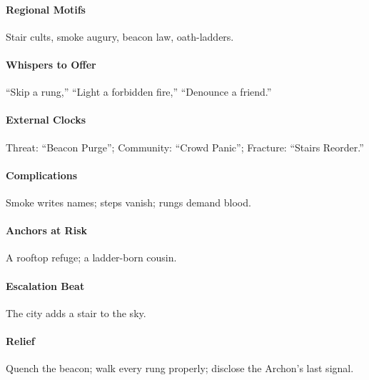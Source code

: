 \paragraph{Regional Motifs} Stair cults, smoke augury, beacon law, oath-ladders.
\paragraph{Whispers to Offer} ``Skip a rung,'' ``Light a forbidden fire,'' ``Denounce a friend.''
\paragraph{External Clocks} Threat: ``Beacon Purge''; Community: ``Crowd Panic''; Fracture: ``Stairs Reorder.''
\paragraph{Complications} Smoke writes names; steps vanish; rungs demand blood.
\paragraph{Anchors at Risk} A rooftop refuge; a ladder-born cousin.
\paragraph{Escalation Beat} The city adds a stair to the sky.
\paragraph{Relief} Quench the beacon; walk every rung properly; disclose the Archon’s last signal.


